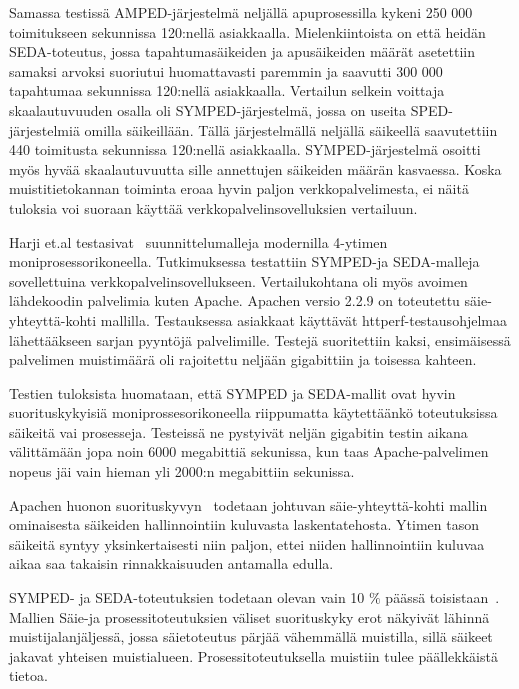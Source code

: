 \documentclass[finnish]{tktltiki2}
\theoremstyle{definition}
\theoremstyle{remark}
\begin{document}
Samassa testissä AMPED-järjestelmä neljällä apuprosessilla
kykeni 250 000 toimitukseen sekunnissa 120:nellä asiakkaalla. Mielenkiintoista on
että heidän SEDA-toteutus, jossa tapahtumasäikeiden ja apusäikeiden
määrät asetettiin samaksi arvoksi suoriutui huomattavasti paremmin ja
saavutti 300 000 tapahtumaa sekunnissa 120:nellä asiakkaalla.
Vertailun selkein voittaja skaalautuvuuden
osalla oli SYMPED-järjestelmä, jossa on useita SPED-järjestelmiä
omilla säikeillään. Tällä järjestelmällä neljällä säikeellä
saavutettiin 440 toimitusta sekunnissa 120:nellä asiakkaalla.
SYMPED-järjestelmä osoitti myös hyvää skaalautuvuutta
sille annettujen säikeiden määrän kasvaessa.
Koska muistitietokannan toiminta eroaa
hyvin paljon verkkopalvelimesta, ei näitä
tuloksia voi suoraan käyttää verkkopalvelinsovelluksien 
vertailuun.

Harji et.al testasivat~\cite{harji_comparing_2012} suunnittelumalleja 
modernilla 4-ytimen moniprosessorikoneella. Tutkimuksessa
testattiin SYMPED-ja SEDA-malleja sovellettuina verkkopalvelinsovellukseen.
Vertailukohtana oli myös avoimen lähdekoodin palvelimia kuten Apache. Apachen 
versio 2.2.9 on toteutettu säie-yhteyttä-kohti mallilla.
Testauksessa asiakkaat käyttävät httperf-testausohjelmaa lähettääkseen
sarjan pyyntöjä palvelimille.
Testejä suoritettiin kaksi, ensimäisessä palvelimen muistimäärä
oli rajoitettu neljään gigabittiin ja toisessa kahteen.

Testien tuloksista huomataan, että SYMPED ja SEDA-mallit
ovat hyvin suorituskykyisiä moniprossesorikoneella riippumatta käytettäänkö
toteutuksissa säikeitä vai prosesseja. Testeissä ne pystyivät
neljän gigabitin testin aikana välittämään jopa noin 6000 megabittiä sekunissa,
kun taas Apache-palvelimen nopeus jäi vain hieman yli 2000:n megabittiin
sekunissa.

Apachen huonon suorituskyvyn~\cite{harji_comparing_2012} todetaan johtuvan säie-yhteyttä-kohti mallin
ominaisesta säikeiden hallinnointiin kuluvasta laskentatehosta.
Ytimen tason säikeitä syntyy yksinkertaisesti niin paljon,
ettei niiden hallinnointiin kuluvaa aikaa saa 
takaisin rinnakkaisuuden antamalla edulla.

SYMPED- ja SEDA-toteutuksien todetaan olevan vain 10 $\%$ päässä
toisistaan~\cite{harji_comparing_2012}. Mallien Säie-ja prosessitoteutuksien väliset suorituskyky erot
näkyivät lähinnä muistijalanjäljessä, jossa säietoteutus
pärjää vähemmällä muistilla, sillä säikeet jakavat
yhteisen muistialueen. Prosessitoteutuksella muistiin tulee
päällekkäistä tietoa.
\end{document}
